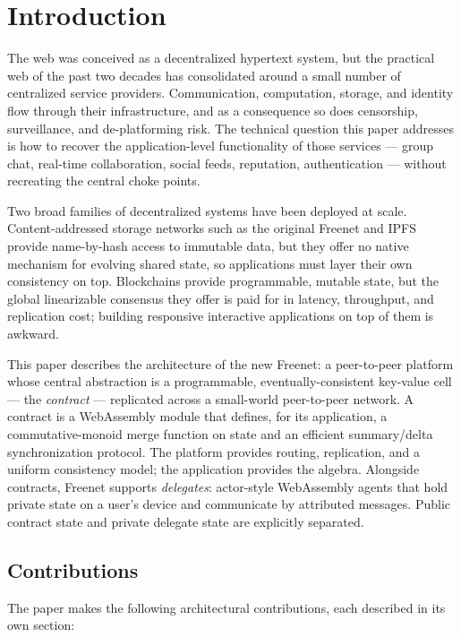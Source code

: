 \section{Introduction}
\label{sec:introduction}

The web was conceived as a decentralized hypertext system, but the practical web of the past two decades has consolidated around a small number of centralized service providers. Communication, computation, storage, and identity flow through their infrastructure, and as a consequence so does censorship, surveillance, and de-platforming risk. The technical question this paper addresses is how to recover the application-level functionality of those services --- group chat, real-time collaboration, social feeds, reputation, authentication --- without recreating the central choke points.

Two broad families of decentralized systems have been deployed at scale. Content-addressed storage networks such as the original Freenet \citep{clarke2001freenet} and IPFS \citep{benet2014ipfs} provide name-by-hash access to immutable data, but they offer no native mechanism for evolving shared state, so applications must layer their own consistency on top. Blockchains \citep{nakamoto2008bitcoin} provide programmable, mutable state, but the global linearizable consensus they offer is paid for in latency, throughput, and replication cost; building responsive interactive applications on top of them is awkward.

This paper describes the architecture of the new Freenet: a peer-to-peer platform whose central abstraction is a programmable, eventually-consistent key-value cell --- the \emph{contract} --- replicated across a small-world peer-to-peer network. A contract is a WebAssembly module that defines, for its application, a commutative-monoid merge function on state and an efficient summary/delta synchronization protocol. The platform provides routing, replication, and a uniform consistency model; the application provides the algebra. Alongside contracts, Freenet supports \emph{delegates}: actor-style WebAssembly agents that hold private state on a user's device and communicate by attributed messages. Public contract state and private delegate state are explicitly separated.

\subsection{Contributions}

The paper makes the following architectural contributions, each described in its own section:

